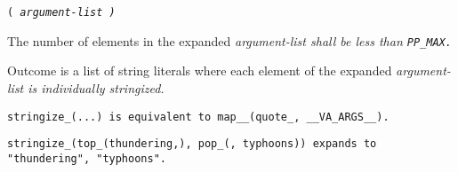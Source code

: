 
 \tt{(} \it{argument-list} \tt{)}


The number of elements in the expanded
\it{argument-list} shall be less than \tt{PP_MAX}.


Outcome is a list of string literals where each element of
the expanded \it{argument-list} is individually stringized.

\note \tt{stringize_(...)} is equivalent to \tt{map__(quote_, __VA_ARGS__)}.

\example \tt{stringize_(top_(thundering,), pop_(, typhoons))}
expands to \tt{"thundering", "typhoons"}.
